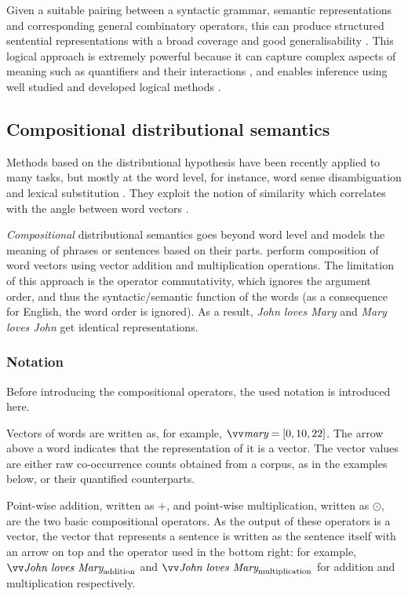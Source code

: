 Given a suitable pairing between a syntactic grammar, semantic representations and corresponding general combinatory operators, this can produce structured sentential representations with a broad coverage and good generalisability \cite{step2008:2222}. This logical approach is extremely powerful because it can capture complex aspects of meaning such as quantifiers and their interactions \cite{Copestake2005}, and enables inference using well studied and developed logical methods \cite{bos2000first}.

\subsection{Compositional distributional semantics}
\label{sec:composition}

Methods based on the distributional hypothesis have been recently applied to many tasks, but mostly at the word level, for instance, word sense disambiguation \cite{ZhitomirskyGeffet2009} and lexical substitution \cite{Thater:2010:CSR:1858681.1858778}. They exploit the notion of similarity which correlates with the angle between word vectors \cite{Turney:2010:FMV:1861751.1861756}.

\emph{Compositional} distributional semantics goes beyond word level and models the meaning of phrases or sentences based on their parts.  perform composition of word vectors using vector addition and multiplication operations. The limitation of this approach is the operator commutativity, which ignores the argument order, and thus the syntactic/semantic function of the words (as a consequence for English, the word order is ignored). As a result, \textit{John loves Mary} and \textit{Mary loves John} get identical representations.

\subsubsection{Notation}

Before introducing the compositional operators, the used notation is introduced here.

Vectors of words are written as, for example, $\ov{\textit{mary}} = [0, 10, 22]$. The arrow above a word indicates that the representation of it is a vector. The vector values are either raw co-occurrence counts obtained from a corpus, as in the examples below, or their quantified counterparts.

Point-wise addition, written as $+$, and point-wise multiplication, written as $\odot$, are the two basic compositional operators. As the output of these operators is a vector, the vector that represents a sentence is written as the sentence itself with an arrow on top and the operator used in the bottom right: for example, $\ov{\text{\it John loves Mary}}_{\text{addition}}$ and $\ov{\text{\it John loves Mary}}_{\text{multiplication}}$ for addition and multiplication respectively.

